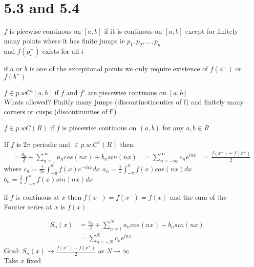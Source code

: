 \documentclass[answers,12pt,addpoints]{exam}
\begin{document}
\section{5.3 and 5.4}
\begin{definition}
    $f$ is piecwise continous on $[a,b]$ if it is continous on $[a,b]$ except for finitely many points where it has finite jumps ie $p_1, p_2, \ldots, p_n$\\ and $f(p_i^\pm)$ exists for all $i$\\ 
\end{definition}
\begin{remark}
    if $a$ or $b$ is one of the excepitonal points we only require existence of $f(a^+)$ or $f(b^-)$
\end{remark}
\begin{definition}
    $f \in p.w C^1 [a,b]$ if $f$ and $f'$ are piecewise continous on $[a,b]$\\
    Whats allowed? Finitly many jumps (discontinotinouties of f) and finitely many corners or cusps (discontinuities of f')
\end{definition}
\begin{definition}
    $f \in p.w C(R)$ if $f$ is piecewise continous on $(a,b)$ for any $a,b \in R$
\end{definition}
\begin{theorem}
    If $f$ is $2\pi$ periodic and $\in p.w.C^1(R)$ then \\
    \begin{align*}
        &= \frac{a_0}{2} + \sum_{n=1}^{\infty} a_n cos(nx) + b_n sin(nx) 
        &= \sum_{n=-\infty}^{\infty} c_n e^{inx}
        &= \frac{f(x^-)+f(x^+)}{2}
    \end{align*}
    where $c_n = \frac{1}{2\pi} \int_{-\pi}^{\pi} f(x) e^{-inx} dx$
    $a_n = \frac{1}{\pi} \int_{-\pi}^{\pi} f(x) cos(nx) dx$
    $b_n = \frac{1}{\pi} \int_{-\pi}^{\pi} f(x) sin(nx) dx$
\end{theorem}
\begin{remark}
    if $f$ is continous at $x$ then $f(x^-) = f(x^+) = f(x)$ and the sum of the Fourier series at $x$ is $f(x)$
\end{remark}
\begin{align*}
    S_n(x) &= \frac{a_0}{2} + \sum_{n=1}^{N} a_n cos(nx) + b_n sin(nx)\\
    &= \sum_{n=-N}^{N} c_n e^{inx}
\end{align*}
Goal: $S_n(x) \to \frac{f(x^-) + f(x^+)}{2}$ as $N \to \infty$\\
Take $x$ fixed
\end{document}
